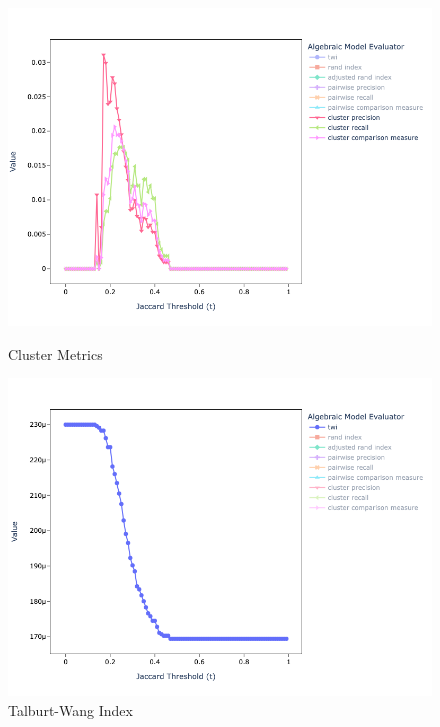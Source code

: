 \documentclass[11pt]{article}
\begin{document}
\begin{figure}[h!]
\begin{minipage}{0.49\textwidth}
            \centering
            \includegraphics[width=\textwidth]{full-alg-cp}
            \caption{Cluster Metrics}
            \label{fig:full-alg-cp}
        \end{minipage}    
        \begin{minipage}{0.49\textwidth}
            \centering
            \includegraphics[width=\textwidth]{full-alg-twi}
            \caption{Talburt-Wang Index}
            \label{fig:full-alf-twi}
        \end{minipage}    
        \begin{minipage}{0.49\textwidth}
            \centering

\end{minipage}
\end{figure}
\end{document}
